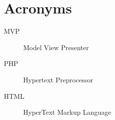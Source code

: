 \chapter{Acronyms}
\begin{description}
   \item[MVP] Model View Presenter
   \item[PHP] Hypertext Preprocessor
   \item[HTML] HyperText Markup Language
\end{description}

